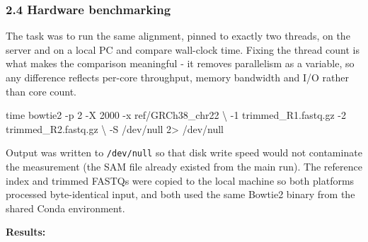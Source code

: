 \documentclass[
  11pt,
  a4paper,
]{article}
\newenvironment{Shaded}{}{}
\newcommand{\AttributeTok}[1]{\textcolor[rgb]{0.49,0.56,0.16}{#1}}
\newcommand{\BuiltInTok}[1]{\textcolor[rgb]{0.00,0.50,0.00}{#1}}
\newcommand{\DataTypeTok}[1]{\textcolor[rgb]{0.56,0.13,0.00}{#1}}
\newcommand{\DecValTok}[1]{\textcolor[rgb]{0.25,0.63,0.44}{#1}}
\newcommand{\NormalTok}[1]{#1}
\newcommand{\OperatorTok}[1]{\textcolor[rgb]{0.40,0.40,0.40}{#1}}
\begin{document}
\hypertarget{hardware-benchmarking}{%
\subsubsection{2.4 Hardware benchmarking}\label{hardware-benchmarking}}

The task was to run the same alignment, pinned to exactly two threads,
on the server and on a local PC and compare wall-clock time. Fixing the
thread count is what makes the comparison meaningful - it removes
parallelism as a variable, so any difference reflects per-core
throughput, memory bandwidth and I/O rather than core count.

\begin{Shaded}
\begin{Highlighting}[]
\BuiltInTok{time}\NormalTok{ bowtie2 }\AttributeTok{{-}p}\NormalTok{ 2 }\AttributeTok{{-}X}\NormalTok{ 2000 }\AttributeTok{{-}x}\NormalTok{ ref/GRCh38\_chr22 }\DataTypeTok{\textbackslash{}}
  \AttributeTok{{-}1}\NormalTok{ trimmed\_R1.fastq.gz }\AttributeTok{{-}2}\NormalTok{ trimmed\_R2.fastq.gz }\DataTypeTok{\textbackslash{}}
  \AttributeTok{{-}S}\NormalTok{ /dev/null }\DecValTok{2}\OperatorTok{\textgreater{}}\NormalTok{ /dev/null}
\end{Highlighting}
\end{Shaded}

Output was written to \texttt{/dev/null} so that disk write speed would
not contaminate the measurement (the SAM file already existed from the
main run). The reference index and trimmed FASTQs were copied to the
local machine so both platforms processed byte-identical input, and both
used the same Bowtie2 binary from the shared Conda environment.

\textbf{Results:}
\end{document}
